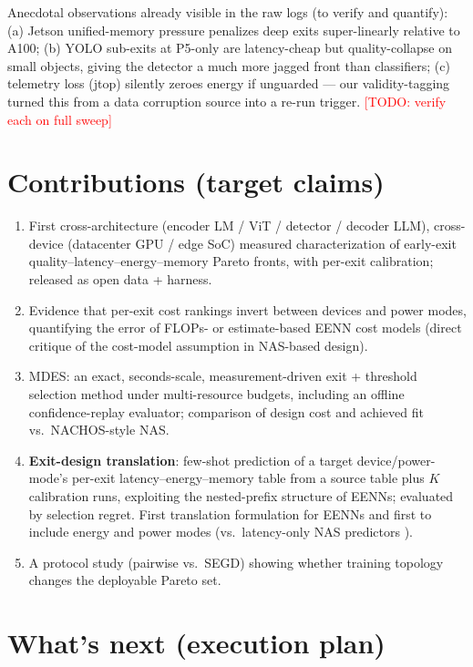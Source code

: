 \documentclass[11pt]{article}
\newcommand{\todo}[1]{\textcolor{red}{[TODO: #1]}}
\newcommand{\mdes}{MDES}
\begin{document}
Anecdotal observations already visible in the raw logs (to verify and
quantify): (a) Jetson unified-memory pressure penalizes deep exits
super-linearly relative to A100; (b) YOLO sub-exits at P5-only are
latency-cheap but quality-collapse on small objects, giving the detector a
much more jagged front than classifiers; (c) telemetry loss (jtop) silently
zeroes energy if unguarded --- our validity-tagging turned this from a data
corruption source into a re-run trigger. \todo{verify each on full sweep}

\section{Contributions (target claims)}

\begin{enumerate}
\item First cross-architecture (encoder LM / ViT / detector / decoder LLM),
cross-device (datacenter GPU / edge SoC) measured characterization of
early-exit quality--latency--energy--memory Pareto fronts, with per-exit
calibration; released as open data + harness.
\item Evidence that per-exit cost rankings invert between devices and power
modes, quantifying the error of FLOPs- or estimate-based EENN cost models
(direct critique of the cost-model assumption in NAS-based design).
\item \mdes{}: an exact, seconds-scale, measurement-driven exit + threshold
selection method under multi-resource budgets, including an offline
confidence-replay evaluator; comparison of design cost and achieved fit
vs.\ NACHOS-style NAS.
\item \textbf{Exit-design translation}: few-shot prediction of a target
device/power-mode's per-exit latency--energy--memory table from a source table
plus $K$ calibration runs, exploiting the nested-prefix structure of EENNs;
evaluated by selection regret. First translation formulation for EENNs and
first to include energy and power modes (vs.\ latency-only NAS predictors
\citep{help2021, multipredict2023}).
\item A protocol study (pairwise vs.\ SEGD) showing whether training topology
changes the deployable Pareto set.
\end{enumerate}

\section{What's next (execution plan)}
\end{document}
